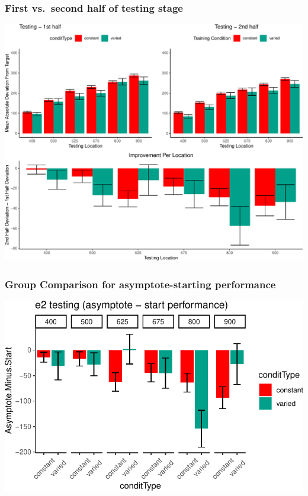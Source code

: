 \documentclass[
  12pt,
  letterpaper,
]{article}
\begin{document}
\subsubsection{First vs.~second half of testing
stage}\label{first-vs.-second-half-of-testing-stage}

\includegraphics{full_files/figure-pdf/unnamed-chunk-61-1.pdf}

\subsubsection{Group Comparison for asymptote-starting
performance}\label{group-comparison-for-asymptote-starting-performance}

\includegraphics{full_files/figure-pdf/unnamed-chunk-62-1.pdf}
\end{document}
